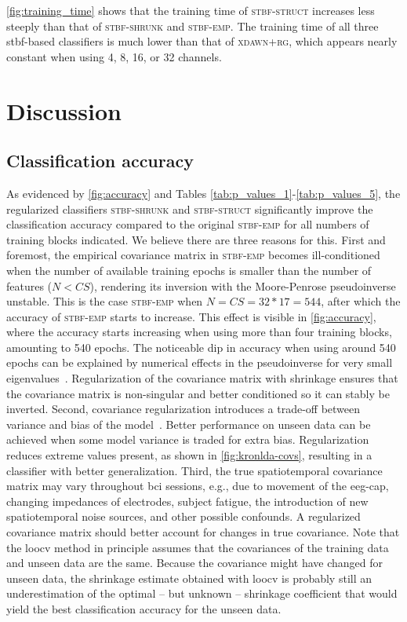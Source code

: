 	\cref{fig:training_time} shows that the training time of
	\textsc{stbf-struct} increases less steeply than that of \textsc{stbf-shrunk}
	and \textsc{stbf-emp}. The training time of all three \ac{stbf}-based classifiers is
	much lower than that of \textsc{xdawn+rg}, which appears nearly constant when using
	4, 8, 16, or 32 channels.

	\section{Discussion}

	\subsection{Classification accuracy}
	As evidenced by \cref{fig:accuracy} and Tables \ref{tab:p_values_1}-\ref{tab:p_values_5}, the regularized classifiers \textsc{stbf-shrunk}
	and \textsc{stbf-struct} significantly improve the classification accuracy
	compared to the original \textsc{stbf-emp} for all numbers of training blocks
	indicated.
	We believe there are three reasons for this.
	First and foremost, the empirical covariance matrix in \textsc{stbf-emp} becomes
	ill-conditioned when the number of available training epochs is smaller than
	the number of features ($N<CS$), rendering its inversion with the
	Moore-Penrose pseudoinverse unstable.
	This is the case \textsc{stbf-emp} when $N=CS=32*17=544$, after which the
	accuracy of \textsc{stbf-emp} starts to increase.
	This effect is visible in \cref{fig:accuracy}, where the accuracy starts
	increasing when using more than four training blocks, amounting to 540 epochs.
	The noticeable dip in accuracy when using around 540 epochs can be explained by
	numerical effects in the pseudoinverse for very small
	eigenvalues~\cite{Blankertz2011, Raudys1998, Schaefer2004,
		Kraemer2009}.
	Regularization of the covariance matrix with shrinkage ensures that the
	covariance matrix is non-singular and better conditioned so it can stably be inverted.
	Second, covariance regularization introduces a trade-off between variance and bias of the model~\cite{Ledoit2004}.
	Better performance on unseen data can be achieved when some model variance is
	traded for extra bias.
	Regularization reduces extreme values present, as shown in
	\cref{fig:kronlda-covs}, resulting in a classifier with
	better generalization.
	Third, the true spatiotemporal covariance matrix may vary throughout \ac{bci}
	sessions, e.g., due to movement of the \ac{eeg}-cap, changing impedances of
	electrodes, subject fatigue, the introduction of new spatiotemporal noise
	sources, and other possible confounds.
	A regularized covariance matrix should better account for changes in true covariance.
	Note that the \ac{loocv} method in principle assumes that the covariances of
	the training data and unseen data are the same.
	Because the covariance might have changed for unseen data, the shrinkage
	estimate obtained with \ac{loocv} is probably still an
	underestimation of the optimal -- but unknown -- shrinkage coefficient that
	would yield the best classification accuracy for the unseen data.

